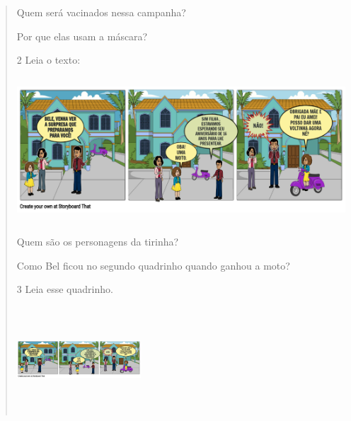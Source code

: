 \begin{verse}

\begin{escolha}
\item Quem será vacinados nessa campanha?


\item Por que elas usam a máscara?

\end{escolha}

\num{2} Leia o texto:


\includegraphics[width=5.56806in,height=2.13216in]{media/image129.png}

\begin{escolha}
\item Quem são os personagens da tirinha?


\item Como Bel ficou no segundo quadrinho quando ganhou a moto?

\end{escolha}

\num{3} Leia esse quadrinho.


\includegraphics[width=1.82014in,height=1.55486in]{media/image130.png}


\end{verse}
